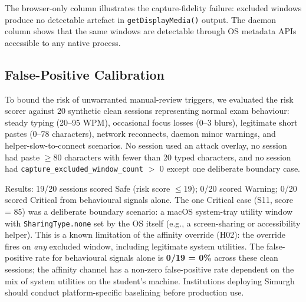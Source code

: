 \documentclass[conference]{IEEEtran}
\begin{document}
\begin{table}[t]
\centering
\small
\caption{Browser-Only vs.\ Daemon-Augmented Detection}
\label{tab:comparison}
\end{table}

The browser-only column illustrates the capture-fidelity failure: excluded windows produce no detectable artefact in \texttt{getDisplayMedia()} output. The daemon column shows that the same windows are detectable through OS metadata APIs accessible to any native process.

\subsection{False-Positive Calibration}

To bound the risk of unwarranted manual-review triggers, we evaluated the risk scorer against 20 synthetic clean sessions representing normal exam behaviour: steady typing (20--95 WPM), occasional focus losses (0--3 blurs), legitimate short pastes (0--78 characters), network reconnects, daemon minor warnings, and helper-slow-to-connect scenarios. No session used an attack overlay, no session had paste $\geq 80$ characters with fewer than 20 typed characters, and no session had \texttt{capture\_excluded\_window\_count} $>$ 0 except one deliberate boundary case.

Results: 19/20 sessions scored Safe (risk score $\leq 19$); 0/20 scored Warning; 0/20 scored Critical from behavioural signals alone. The one Critical case (S11, score = 85) was a deliberate boundary scenario: a macOS system-tray utility window with \texttt{SharingType.none} set by the OS itself (e.g., a screen-sharing or accessibility helper). This is a known limitation of the affinity override (H02): the override fires on \textit{any} excluded window, including legitimate system utilities. The false-positive rate for behavioural signals alone is \textbf{0/19 = 0\%} across these clean sessions; the affinity channel has a non-zero false-positive rate dependent on the mix of system utilities on the student's machine. Institutions deploying Simurgh should conduct platform-specific baselining before production use.
\end{document}
